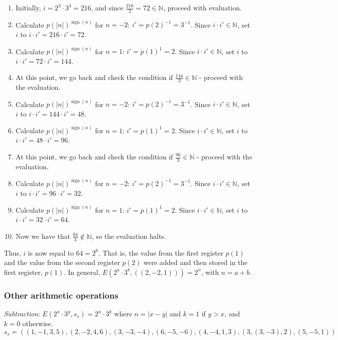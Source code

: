\documentclass{article}
\DeclareMathOperator{\sign}{sign}
\begin{document}
\begin{enumerate}
\item Initially, $i = 2^3 \cdot 3^3 = 216$, and since $\frac{216}{3} = 72 \in \mathbb{N}$, proceed with evaluation.
\item Calculate $p(|n|)^{\sign(n)}$ for $n = -2$: $i' = p(2)^{-1} = 3^{-1}$. Since $i \cdot i' \in \mathbb{N}$, set $i$ to $i \cdot i' = 216 \cdot i' = 72$.
\item Calculate $p(|n|)^{\sign(n)}$ for $n = 1$: $i' = p(1)^{1} = 2$. Since $i \cdot i' \in \mathbb{N}$, set $i$ to $i \cdot i' = 72 \cdot i' = 144$.
\item At this point, we go back and check the condition if $\frac{144}{3} \in \mathbb{N}$ - proceed with the evaluation.
\item Calculate $p(|n|)^{\sign(n)}$ for $n = -2$: $i' = p(2)^{-1} = 3^{-1}$. Since $i \cdot i' \in \mathbb{N}$, set $i$ to $i \cdot i' = 144 \cdot i' = 48$.
\item Calculate $p(|n|)^{\sign(n)}$ for $n = 1$: $i' = p(1)^{1} = 2$. Since $i \cdot i' \in \mathbb{N}$, set $i$ to $i \cdot i' = 48 \cdot i' = 96$.
\item At this point, we go back and check the condition if $\frac{96}{3} \in \mathbb{N}$ - proceed with the evaluation.
\item Calculate $p(|n|)^{\sign(n)}$ for $n = -2$: $i' = p(2)^{-1} = 3^{-1}$. Since $i \cdot i' \in \mathbb{N}$, set $i$ to $i \cdot i' = 96 \cdot i' = 32$.
\item Calculate $p(|n|)^{\sign(n)}$ for $n = 1$: $i' = p(1)^{1} = 2$. Since $i \cdot i' \in \mathbb{N}$, set $i$ to $i \cdot i' = 32 \cdot i' = 64$.
\item Now we have that $\frac{64}{3} \notin \mathbb{N}$, so the evaluation halts.
\end{enumerate}

Thus, $i$ is now equal to $64 = 2^6$. That is, the value from the first register $p(1)$ and the value from the second register $p(2)$ were added and then stored in the first register, $p(1)$. In general, $E(2^a \cdot 3^b, ((2, -2, 1))) = 2^n$, with $n = a + b$.

\subsubsection{Other arithmetic operations}

\textit{Subtraction}: $E(2^x \cdot 3^y, s_s) = 2^n \cdot 3^k$ where $n = |x - y|$ and $k = 1$ if $y > x$, and $k = 0$ otherwise.
$$s_s = ((1, -1, 3, 5), (2, -2, 4, 6), (3, -3, -4), (6, -5, -6), (4, -4, 1, 3), (3, (3, -3), 2), (5, -5, 1))$$
\end{document}
